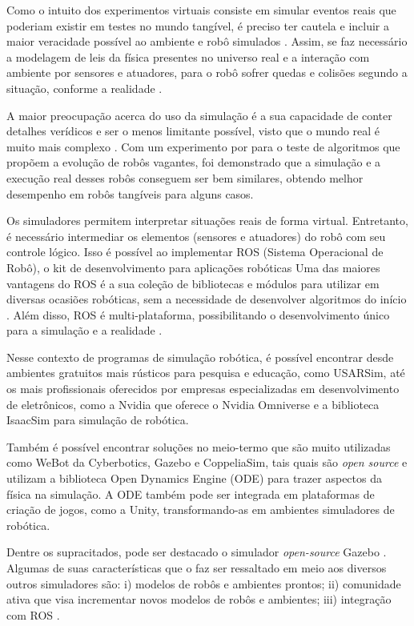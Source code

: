 Como o intuito dos experimentos virtuais consiste em simular eventos reais que poderiam existir em testes no mundo tangível, é preciso ter cautela e incluir a maior veracidade possível ao ambiente e robô simulados \cite{aprendizadoHeinen:2010}.  
Assim, se faz necessário a modelagem de leis da física presentes no universo real e a interação com ambiente por sensores e atuadores, para o robô sofrer quedas e colisões segundo a situação, conforme a realidade \cite{usarsimCarpin:2007, evolucaoHeinen:2006}.  

A maior preocupação acerca do uso da simulação é a sua capacidade de conter detalhes verídicos e ser o menos limitante possível, visto que o mundo  real é muito mais complexo  \cite{wanderingMiglino:1994}. 
Com um experimento por \citet{wanderingMiglino:1994} para o teste de algoritmos que propõem a evolução de robôs vagantes, foi demonstrado que a simulação e a execução real desses robôs conseguem ser bem similares, obtendo melhor desempenho em robôs tangíveis para alguns casos.

Os simuladores permitem interpretar situações reais de forma virtual. Entretanto, é necessário intermediar os elementos (sensores e atuadores) do robô com seu controle lógico. Isso é possível ao implementar ROS (Sistema Operacional de Robô), o kit de desenvolvimento para aplicações robóticas \cite{ROS} Uma das maiores vantagens do ROS é a sua coleção de bibliotecas e módulos para utilizar em diversas ocasiões robóticas, sem a necessidade de desenvolver algoritmos do início \cite{ROS}. Além disso, ROS é multi-plataforma, possibilitando o desenvolvimento único  para a simulação e a realidade \cite{ROS}.

Nesse contexto de programas de simulação robótica,  é possível encontrar desde ambientes gratuitos mais rústicos para pesquisa e educação, como USARSim,  até os mais profissionais oferecidos por empresas especializadas em desenvolvimento de eletrônicos, como a Nvidia que oferece o Nvidia Omniverse e a biblioteca IsaacSim para simulação de robótica. 

Também é possível encontrar soluções no meio-termo que são muito utilizadas como WeBot da Cyberbotics, Gazebo e CoppeliaSim, tais quais são \textit{open source} e utilizam a biblioteca Open Dynamics Engine (ODE) para trazer aspectos da física na simulação.  A ODE também pode ser integrada em plataformas de criação de jogos, como a Unity, transformando-as em ambientes simuladores de robótica. 

Dentre os supracitados, pode ser destacado o simulador \textit{open-source} Gazebo \cite{gazeboDesigns:2004}. Algumas de suas características que o faz ser ressaltado em meio aos diversos outros simuladores são: i) modelos de robôs e ambientes prontos; ii) comunidade ativa que visa incrementar novos modelos de robôs e ambientes; iii) integração com ROS \cite{gazeboDesigns:2004, pickSimulatorFarley:2022}.

